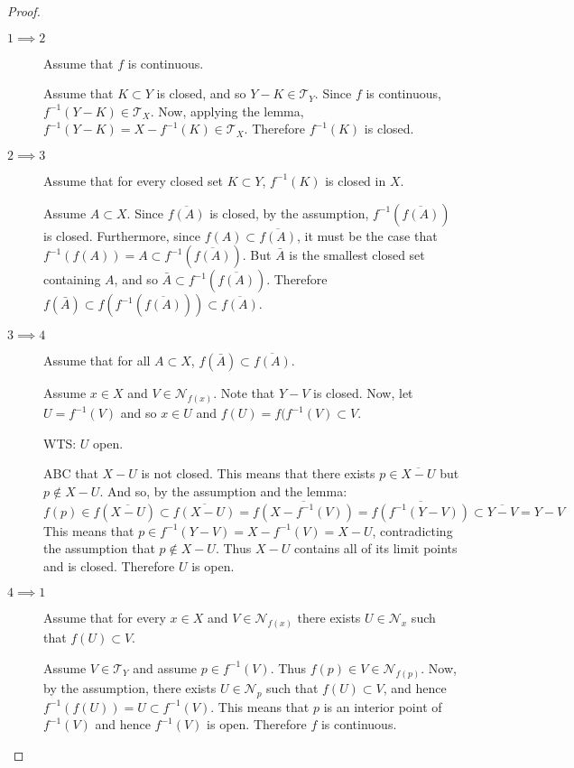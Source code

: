 \documentclass[letterpaper,12pt,fleqn]{article}
\newcommand{\T}{\mathscr{T}}
\renewcommand{\N}{\mathcal{N}}
\begin{document}
\begin{proof}
  \begin{description}
  \item[]
  \item[\(1\implies2\)] Assume that \(f\) is continuous.

    Assume that \(K\subset Y\) is closed, and so \(Y-K\in\T_Y\).  Since \(f\) is continuous,
    \(f^{-1}(Y-K)\in\T_X\).  Now, applying the lemma, \(f^{-1}(Y-K)=X-f^{-1}(K)\in\T_X\).  Therefore
    \(f^{-1}(K)\) is closed.

  \item[\(2\implies3\)] Assume that for every closed set \(K\subset Y\), \(f^{-1}(K)\) is closed in \(X\).

    Assume \(A\subset X\).  Since \(\overline{f(A)}\) is closed, by the assumption, \(f^{-1}(\overline{f(A)})\) is
    closed.  Furthermore, since \(f(A)\subset\overline{f(A)}\), it must be the case that
    \(f^{-1}(f(A))=A\subset f^{-1}(\overline{f(A)})\).  But \(\bar{A}\) is the smallest closed set containing \(A\),
    and so \(\bar{A}\subset f^{-1}(\overline{f(A)})\).
    Therefore \(f(\bar{A})\subset f(f^{-1}(\overline{f(A)}))\subset\overline{f(A)}\).

  \item[\(3\implies4\)] Assume that for all \(A\subset X\), \(f(\bar{A})\subset\overline{f(A)}\).

    Assume \(x\in X\) and \(V\in\N_{f(x)}\).  Note that \(Y-V\) is closed.  Now, let \(U=f^{-1}(V)\) and so
    \(x\in U\) and \(f(U)=f(f^{-1}(V)\subset V\).

    WTS: \(U\) open.

    ABC that \(X-U\) is not closed.  This means that there exists \(p\in\overline{X-U}\) but \(p\notin X-U\).
    And so, by the assumption and the lemma:
    \[f(p)\in f(\overline{X-U})\subset\overline{f(X-U)}=\overline{f(X-f^{-1}(V))}=\overline{f(f^{-1}(Y-V))}\subset
    \overline{Y-V}=Y-V\]
    This means that \(p\in f^{-1}(Y-V)=X-f^{-1}(V)=X-U\), contradicting the assumption that \(p\notin X-U\).
    Thus \(X-U\) contains all of its limit points and is closed.  Therefore \(U\) is open.

  \item[\(4\implies1\)] Assume that for every \(x\in X\) and \(V\in\N_{f(x)}\) there exists \(U\in\N_x\) such that
    \(f(U)\subset V\).

    Assume \(V\in\T_Y\) and assume \(p\in f^{-1}(V)\).  Thus \(f(p)\in V\in\N_{f(p)}\).  Now, by the assumption,
    there exists \(U\in\N_p\) such that \(f(U)\subset V\), and hence \(f^{-1}(f(U))=U\subset f^{-1}(V)\).  This
    means that \(p\) is an interior point of \(f^{-1}(V)\) and hence \(f^{-1}(V)\) is open.  Therefore \(f\) is
    continuous.
  \end{description}
\end{proof}
\end{document}
